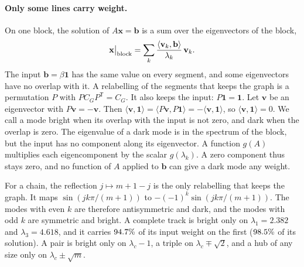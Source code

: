 \documentclass[11pt,a4paper]{article}
\newenvironment{gssblock}{\color{teal}}{}%
\begin{document}
\begin{gssblock}
\paragraph{Only some lines carry weight.}
On one block, the solution of $A\mathbf{x}=\mathbf{b}$ is a sum over the eigenvectors of the block,
\begin{equation}
\label{eq:block:solution}
\mathbf{x}\big|_{\rm block}=\sum_k\frac{\langle\mathbf{v}_k,\mathbf{b}\rangle}{\lambda_k}\,\mathbf{v}_k .
\end{equation}
The input $\mathbf{b}=\beta\mathbf{1}$ has the same value on every segment, and some eigenvectors have no
overlap with it. A relabelling of the segments that keeps the graph is a permutation $P$ with
$PC_GP^{\mathsf T}=C_G$. It also keeps the input: $P\mathbf{1}=\mathbf{1}$. Let $\mathbf{v}$ be an
eigenvector with $P\mathbf{v}=-\mathbf{v}$. Then
$\langle\mathbf{v},\mathbf{1}\rangle=\langle P\mathbf{v},P\mathbf{1}\rangle=-\langle\mathbf{v},\mathbf{1}\rangle$,
so $\langle\mathbf{v},\mathbf{1}\rangle=0$. We call a mode bright when its overlap with the input is not
zero, and dark when the overlap is zero. The eigenvalue of a dark mode is in the spectrum of the block,
but the input has no component along its eigenvector. A function $g(A)$ multiplies each
eigencomponent by the scalar $g(\lambda_k)$. A zero component thus stays zero, and no function of $A$
applied to $\mathbf{b}$ can give a dark mode any weight.

For a chain, the reflection $j\mapsto m+1-j$ is the only relabelling that keeps the graph. It maps
$\sin(jk\pi/(m+1))$ to $-(-1)^k\sin(jk\pi/(m+1))$. The modes with even $k$ are therefore antisymmetric
and dark, and the modes with odd $k$ are symmetric and bright. A complete track is bright only on
$\lambda_1=2.382$ and $\lambda_3=4.618$, and it carries $94.7\%$ of its input weight on
the first ($98.5\%$ of its solution). A pair is bright only on $\lambda_c-1$, a triple
on $\lambda_c\mp\sqrt2$, and a hub of any size only on $\lambda_c\pm\sqrt m$.


\end{gssblock}
\end{document}
